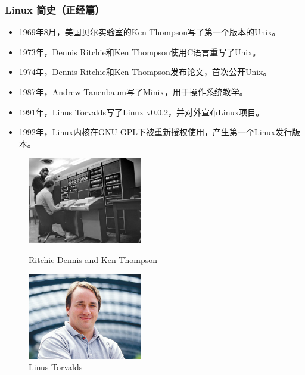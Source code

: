 \documentclass{beamer}
\begin{document}
\begin{frame}
    \frametitle{Linux 简史（正经篇）}
    \footnotesize
    \begin{itemize}
        \item 1969年8月，美国贝尔实验室的Ken Thompson写了第一个版本的Unix。
        \item 1973年，Dennis Ritchie和Ken Thompson使用C语言重写了Unix。
        \item 1974年，Dennis Ritchie和Ken Thompson发布论文，首次公开Unix。
        \item 1987年，Andrew Tanenbaum写了Minix，用于操作系统教学。
        \item 1991年，Linus Torvalds写了Linux v0.0.2，并对外宣布Linux项目。
        \item 1992年，Linux内核在GNU GPL下被重新授权使用，产生第一个Linux发行版本。
    \end{itemize}

    \begin{figure}[htbp]
    \centering
    \begin{minipage}[t]{0.48\textwidth}
    \centering
    \includegraphics[width=5cm]{images/thompson_and_ritchie.jpg}
    \caption{Ritchie Dennis and Ken Thompson}
    \end{minipage}
    \begin{minipage}[t]{0.48\textwidth}
    \centering
    \includegraphics[width=5cm]{images/linus_torvalds.jpg}
    \caption{Linus Torvalds}
    \end{minipage}
    \end{figure}
\end{frame}
\end{document}
